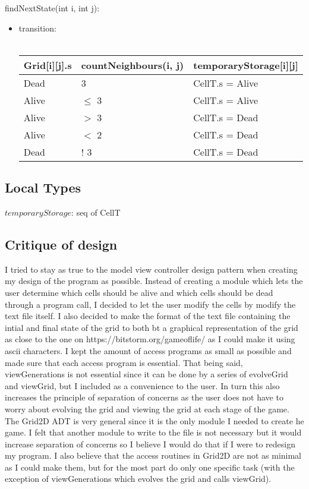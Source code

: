 \documentclass[12pt]{article}
\begin{document}
\noindent findNextState(int i, int j):
\begin{itemize}
	\item transition:\\\\
	\begin{tabular}{| l | l | l |}
		\hline
		\textbf{Grid[i][j].s} & \textbf{countNeighbours(i, j)} & \textbf{temporaryStorage[i][j]} \\
		\hline
		Dead & 3 & CellT.s = Alive\\
		\hline
		Alive & $ \leq $ 3 & CellT.s = Alive\\
		\hline
		Alive & $ > $ 3 & CellT.s = Dead\\
		\hline
		Alive & $ < $ 2 & CellT.s = Dead\\
		\hline
		Dead & $!$ 3 & CellT.s = Dead\\
		\hline
	\end{tabular}
	
\end{itemize}

\subsection*{Local Types}
$ temporaryStorage $: seq of CellT
\newpage

\subsection*{Critique of design}

I tried to stay as true to the model view controller design pattern when creating my design of the program as possible. Instead of creating a module which lets the user determine which cells should be alive and which cells should be dead through a program call, I decided to let the user modify the cells by modify the text file itself. I also decided to make the format of the text file containing the intial and final state of the grid to both bt a graphical representation of the grid as close to the one on https://bitstorm.org/gameoflife/ as I could make it using ascii characters. I kept the amount of access programs as small as possible and made sure that each access program is essential. That being said, viewGenerations is not essential since it can be done by a series of evolveGrid and viewGrid, but I included as a convenience to the user. In turn this also increases the principle of separation of concerns as the user does not have to worry about evolving the grid and viewing the grid at each stage of the game. The Grid2D ADT is very general since it is the only module I needed to create he game. I felt that another module to write to the file is not necessary but it would increase separation of concerns so I believe I would do that if I were to redesign my program. I also believe that the access routines in Grid2D are not as minimal as I could make them, but for the most part do only one specific task (with the exception of viewGenerations which evolves the grid and calls viewGrid). 
\end{document}
